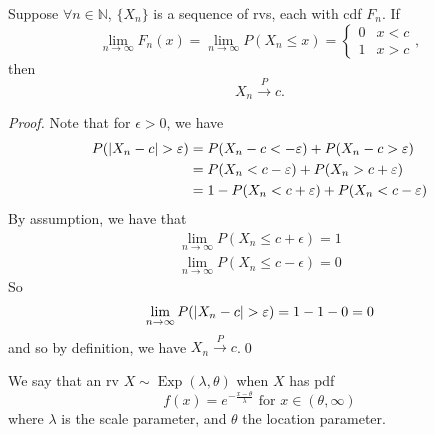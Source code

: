 \documentclass[notoc,notitlepage]{tufte-book}
\DeclareMathOperator{\Exp}{Exp }
\newcommand{\convp}{\overset{P}{\to}}
\begin{document}
\begin{propo}
\label{propo:partial_converse_of_convp_implies_convd}
  Suppose $\forall n \in \mathbb{N}$, $\{X_n\}$ is a sequence of rvs, each with cdf $F_n$. If
  \begin{equation*}
    \lim_{n \to \infty} F_n(x) = \lim_{n \to \infty} P( X_n \leq x ) = \begin{cases}
      0 & x < c \\
      1 & x > c
    \end{cases},
  \end{equation*}
  then
  \begin{equation*}
    X_n \convp c.
  \end{equation*}
\end{propo}

\begin{proof}
  Note that for $\epsilon > 0$, we have
  \begin{align*}
    P( \left|X_n - c\right| > \varepsilon ) &= P( X_n - c < -\varepsilon ) + P( X_n - c > \varepsilon ) \\
                                  &= P( X_n < c - \varepsilon ) + P( X_n > c + \varepsilon ) \\
                                  &= 1 - P( X_n < c + \varepsilon ) + P ( X_n < c - \varepsilon )
  \end{align*}
  By assumption, we have that
  \begin{gather*}
    \lim_{n \to \infty} P( X_n \leq c + \epsilon ) = 1 \\
    \lim_{n \to \infty} P( X_n \leq c - \epsilon ) = 0
  \end{gather*}
  So
  \begin{equation*}
    \lim_{n \to \infty} P(\left|X_n - c\right| > \varepsilon) = 1 - 1 - 0 = 0
  \end{equation*}
  and so by definition, we have $X_n \convp c$.\qed
\end{proof}

\begin{defn}
\label{defn:double_parameter_exponential_distribution}
We say that an rv $X \sim \Exp(\lambda, \theta)$ when $X$ has pdf
\begin{equation*}
  f(x) = e^{- \frac{x - \theta}{\lambda}} \text{ for } x \in (\theta, \infty)
\end{equation*}
where $\lambda$ is the scale parameter, and $\theta$ the location parameter.
\end{defn}
\end{document}
